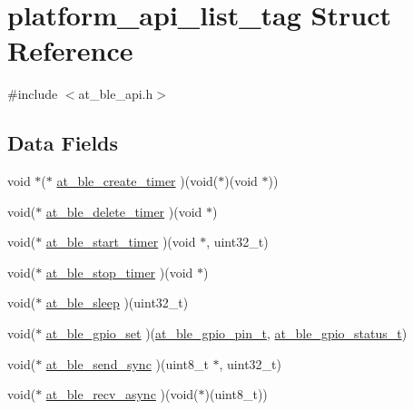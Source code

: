 \hypertarget{structplatform__api__list__tag}{}\section{platform\+\_\+api\+\_\+list\+\_\+tag Struct Reference}
\label{structplatform__api__list__tag}


{\ttfamily \#include $<$at\+\_\+ble\+\_\+api.\+h$>$}

\subsection*{Data Fields}
\begin{DoxyCompactItemize}
\item 
void $\ast$($\ast$ \mbox{\hyperlink{structplatform__api__list__tag_a8f8a8e7829d19ccdb3dce134d8140a48}{at\+\_\+ble\+\_\+create\+\_\+timer}} )(void($\ast$)(void $\ast$))
\item 
void($\ast$ \mbox{\hyperlink{structplatform__api__list__tag_afc393e3c529d8d0d3fd3d01405df5f5b}{at\+\_\+ble\+\_\+delete\+\_\+timer}} )(void $\ast$)
\item 
void($\ast$ \mbox{\hyperlink{structplatform__api__list__tag_abba02aa060e675c2fd0c40239590b282}{at\+\_\+ble\+\_\+start\+\_\+timer}} )(void $\ast$, uint32\+\_\+t)
\item 
void($\ast$ \mbox{\hyperlink{structplatform__api__list__tag_a1e4365dfd0c3abc53a6606666eca642c}{at\+\_\+ble\+\_\+stop\+\_\+timer}} )(void $\ast$)
\item 
void($\ast$ \mbox{\hyperlink{structplatform__api__list__tag_aeeffc922c17a44abe856a74535525071}{at\+\_\+ble\+\_\+sleep}} )(uint32\+\_\+t)
\item 
void($\ast$ \mbox{\hyperlink{structplatform__api__list__tag_a59b1e106bd8f802137aaffb623615b47}{at\+\_\+ble\+\_\+gpio\+\_\+set}} )(\mbox{\hyperlink{at__ble__api_8h_a61a821528aac297115a567966e105541}{at\+\_\+ble\+\_\+gpio\+\_\+pin\+\_\+t}}, \mbox{\hyperlink{at__ble__api_8h_ae8d1673bd3af8885704ebdf934979794}{at\+\_\+ble\+\_\+gpio\+\_\+status\+\_\+t}})
\item 
void($\ast$ \mbox{\hyperlink{structplatform__api__list__tag_a7dedc9e57abc6b93f5a62e6479b2bb2b}{at\+\_\+ble\+\_\+send\+\_\+sync}} )(uint8\+\_\+t $\ast$, uint32\+\_\+t)
\item 
void($\ast$ \mbox{\hyperlink{structplatform__api__list__tag_a359967572048a76805e148cd9af74a3c}{at\+\_\+ble\+\_\+recv\+\_\+async}} )(void($\ast$)(uint8\+\_\+t))
\item 

\end{DoxyCompactItemize}
